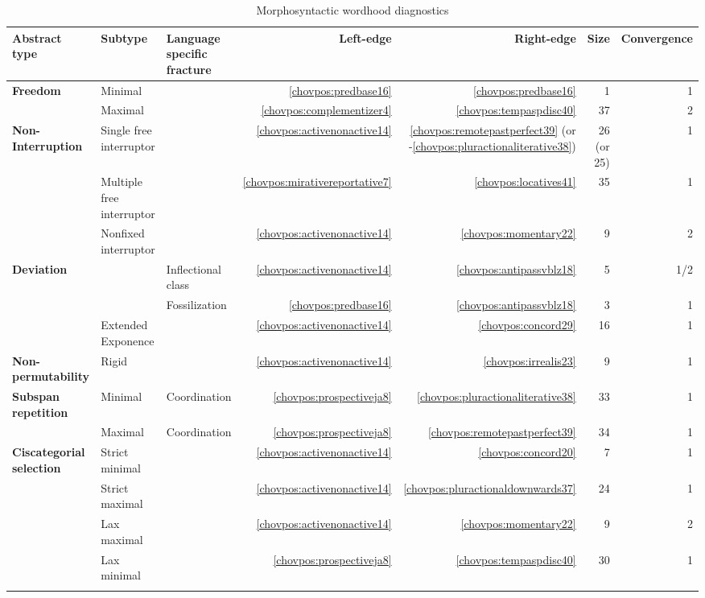 \documentclass[output=paper]{langscibook}
\begin{document}
\begin{sidewaystable}
    \caption{Morphosyntactic wordhood diagnostics}
    \label{tab:chor:key:4}
    \begin{tabularx}{\textwidth}{QQQrrrr}
         \lsptoprule
\textbf{Abstract type} & \textbf{Subtype} & \textbf{Language specific fracture} & \textbf{Left-edge} & \textbf{Right-edge} & \textbf{Size} & \textbf{Convergence} \\
\midrule
\textbf{Freedom} & Minimal & ~ & \ref{chovpos:predbase16} & \ref{chovpos:predbase16} & 1 & 1\\
& Maximal & ~ & \ref{chovpos:complementizer4} & \ref{chovpos:tempaspdisc40} & 37 & 2\\
\textbf{Non-Interruption} & Single free interruptor & ~ & \ref{chovpos:activenonactive14} & \ref{chovpos:remotepastperfect39} (or -\ref{chovpos:pluractionaliterative38}) & 26 (or 25) & 1\\
& Multiple free interruptor & ~ & \ref{chovpos:mirativereportative7} &\ref{chovpos:locatives41} & 35 & 1\\
& Nonfixed interruptor & ~ & \ref{chovpos:activenonactive14} & \ref{chovpos:momentary22} & 9 & 2\\
\textbf{Deviation} & ~ & Inflectional class & \ref{chovpos:activenonactive14} & \ref{chovpos:antipassvblz18} & 5 & 1/2\\
& ~ & Fossilization & \ref{chovpos:predbase16} & \ref{chovpos:antipassvblz18} & 3 & 1\\
& Extended Exponence & ~ & \ref{chovpos:activenonactive14} & \ref{chovpos:concord29} & 16 & 1\\
\textbf{Non-permutability} & Rigid &  & \ref{chovpos:activenonactive14} & \ref{chovpos:irrealis23} & 9 & 1\\
\textbf{Subspan repetition} & Minimal & Coordination & \ref{chovpos:prospectiveja8} & \ref{chovpos:pluractionaliterative38} & 33 & 1\\
& Maximal & Coordination & \ref{chovpos:prospectiveja8} & \ref{chovpos:remotepastperfect39} & 34 & 1\\
\textbf{Ciscategorial selection} & Strict minimal & ~ & \ref{chovpos:activenonactive14} & \ref{chovpos:concord20} & 7 & 1\\
& Strict maximal & ~ & \ref{chovpos:activenonactive14} & \ref{chovpos:pluractionaldownwards37} & 24 & 1\\
& Lax maximal & ~ & \ref{chovpos:activenonactive14} & \ref{chovpos:momentary22} & 9 & 2\\
& Lax minimal & ~ & \ref{chovpos:prospectiveja8} & \ref{chovpos:tempaspdisc40} & 30 & 1\\
\lspbottomrule
    \end{tabularx}
\end{sidewaystable}
\end{document}
